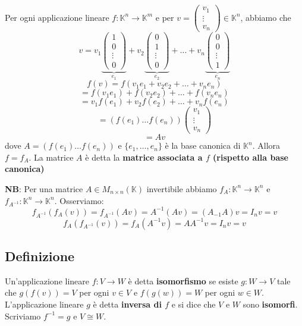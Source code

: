 \documentclass[a4paper]{article}
\theoremstyle{break}
\theoremstyle{break}
\theoremstyle{break}
\theoremstyle{break}
\begin{document}
Per ogni applicazione lineare \( f: \mathbb{K}^n \to \mathbb{K}^m \) e per 
\( v = \begin{pmatrix} v_1\\\vdots\\v_n \end{pmatrix} \in \mathbb{K}^n \), abbiamo che
\[
  v = v_1 \underbrace{\begin{pmatrix} 
  1\\0\\\vdots\\0
\end{pmatrix}}_{e_1}
+ v_2 \underbrace{\begin{pmatrix} 
  0\\1\\\vdots\\0
\end{pmatrix}}_{e_2}
+ \ldots +
v_n \underbrace{\begin{pmatrix} 
  0\\0\\\vdots\\1
\end{pmatrix}}_{e_n}
\] 
\[
f(v) = f(v_1 e_1 + v_2 e_2 + \ldots + v_n e_n)
\] 
\[
= f(v_1 e_1) + f(v_2 e_2) + \ldots + f(v_n e_n)
\] 
\[
= v_1 f(e_1) + v_2 f(e_2) + \ldots + v_n f(e_n)
\] 
\[
= \left( f(e_1) \ldots f(e_n) \right) \begin{pmatrix} v_1\\\vdots\\v_n \end{pmatrix} 
\] 
\[
= Av
\] 
dove \( A = (f(e_1) \ldots f(e_n)) \) e \( \{e_1, \ldots, e_n\}  \) è la base canonica
di \( \mathbb{K}^n \). Allora \( f = f_A \). La matrice \( A \) è detta la
\textbf{matrice associata a \( f \) (rispetto alla base canonica)}

\vspace{1em}
\noindent \textbf{NB}: Per una matrice \( A \in M_{n \times n}(\mathbb{K}) \) invertibile
abbiamo \( f_A: \mathbb{K}^n \to \mathbb{K}^n \) e \( f_{A^{-1}}: \mathbb{K}^n \to \mathbb{K}^n \).
Osserviamo:
\[
  f_{A^{-1}}(f_A(v)) = f_{A^{-1}}(Av) = A^{-1}(Av) = (A_{-1}A)v = I_nv = v
\] 
\[
  f_A(f_{A^{-1}}(v)) = f_A(A^{-1}v) = AA^{-1}v = I_nv = v
\] 

\subsection{Definizione}
Un'applicazione lineare \( f: V \to W \) è detta \textbf{isomorfismo} se esiste
\( g: W \to V \) tale che \( g(f(v)) = V \) per ogni \( v \in V \) e
\( f(g(w)) = W \) per ogni \( w \in W \). L'applicazione lineare \( g \) è detta
\textbf{inversa di \( f \) } e si dice che \( V \) e \( W \) sono \textbf{isomorfi}.
Scriviamo \( f^{-1} = g \) e \( V \cong W \).
\end{document}
